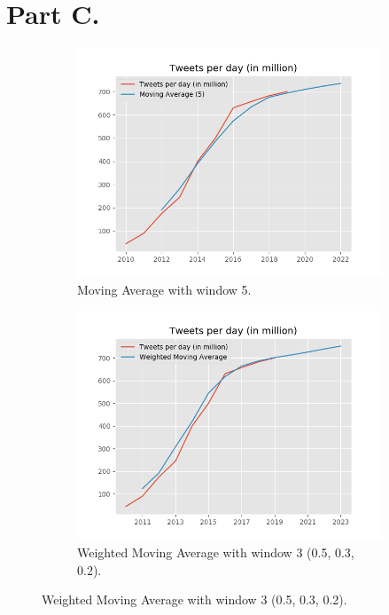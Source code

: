 \section{Part C.}
\begin{figure}[t]
\begin{subfigure}[t]{0.30\linewidth}
\includegraphics[width=\linewidth ]{fig/tweets_ma.png}
\caption{{\footnotesize Moving Average with window 5.}}\vspace{-2mm}
\label{fig:pla1}
\end{subfigure}
\begin{subfigure}[t]{0.30\linewidth}
\includegraphics[width=\linewidth ]{fig/tweets_wma.png}
\caption{{\footnotesize Weighted Moving Average with window 3 (0.5, 0.3, 0.2).}}\vspace{-2mm}

\end{subfigure}
\end{figure}
